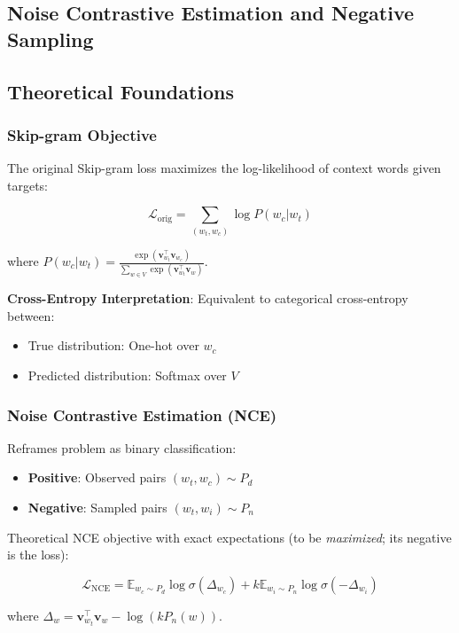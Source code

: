 \begin{notechapter}
\chapter{Noise Contrastive Estimation and Negative Sampling}\label{ch:nce-negative-sampling}

\section{Theoretical Foundations}
\subsection{Skip-gram Objective}
The original Skip-gram loss maximizes the log-likelihood 
of context words given targets:

\[
\mathcal{L}_{\text{orig}} = \sum_{(w_t,w_c)} \log P(w_c|w_t)
\]

where \( P(w_c|w_t) = \frac{\exp(\mathbf{v}_{w_t}^\top 
\mathbf{v}_{w_c})}{\sum_{w \in V} \exp(\mathbf{v}_{w_t}^\top 
\mathbf{v}_w)} \).

\textbf{Cross-Entropy Interpretation}: Equivalent to 
categorical cross-entropy between:
\begin{itemize}
    \item True distribution: One-hot over \( w_c \)
    \item Predicted distribution: Softmax over \( V \)
\end{itemize}

\subsection{Noise Contrastive Estimation (NCE)}
Reframes problem as binary classification:
\begin{itemize}
    \item \textbf{Positive}: Observed pairs \( (w_t,w_c) \sim P_d \)
    \item \textbf{Negative}: Sampled pairs \( (w_t,w_i) \sim P_n \)
\end{itemize}

Theoretical NCE objective with exact expectations (to be \emph{maximized}; its negative is the loss):

\[
\mathcal{L}_{\text{NCE}} = \mathbb{E}_{w_c \sim P_d} 
\log \sigma(\Delta_{w_c}) + k \mathbb{E}_{w_i \sim P_n} 
\log \sigma(-\Delta_{w_i})
\]

where \( \Delta_w = \mathbf{v}_{w_t}^\top \mathbf{v}_w 
- \log(kP_n(w)) \).


\end{notechapter}

